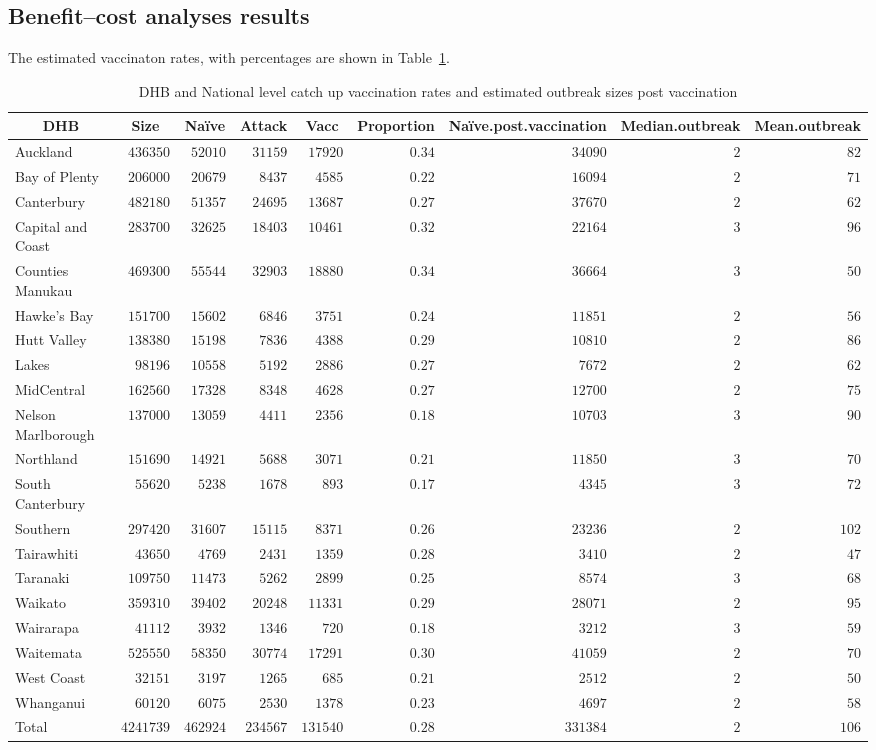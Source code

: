 \documentclass{article}
\begin{document}
\subsection{Benefit--cost analyses results}

The estimated vaccinaton rates, with percentages are shown in Table~\ref{table:vacp}.

\begin{table}\small
\caption{DHB and National level catch up vaccination rates and estimated outbreak sizes post vaccination}
\begin{center}
\begin{tabular}{lrrrrrrrr}
\hline\hline
\multicolumn{1}{c}{DHB}&\multicolumn{1}{c}{Size}&\multicolumn{1}{c}{Naïve}&\multicolumn{1}{c}{Attack}&\multicolumn{1}{c}{Vacc}&\multicolumn{1}{c}{Proportion}&\multicolumn{1}{c}{Naïve.post.vaccination}&\multicolumn{1}{c}{Median.outbreak}&\multicolumn{1}{c}{Mean.outbreak}\tabularnewline
\hline
Auckland&$ 436350$&$ 52010$&$ 31159$&$ 17920$&$0.34$&$ 34090$&$2$&$ 82$\tabularnewline
Bay of Plenty&$ 206000$&$ 20679$&$  8437$&$  4585$&$0.22$&$ 16094$&$2$&$ 71$\tabularnewline
Canterbury&$ 482180$&$ 51357$&$ 24695$&$ 13687$&$0.27$&$ 37670$&$2$&$ 62$\tabularnewline
Capital and Coast&$ 283700$&$ 32625$&$ 18403$&$ 10461$&$0.32$&$ 22164$&$3$&$ 96$\tabularnewline
Counties Manukau&$ 469300$&$ 55544$&$ 32903$&$ 18880$&$0.34$&$ 36664$&$3$&$ 50$\tabularnewline
Hawke's Bay&$ 151700$&$ 15602$&$  6846$&$  3751$&$0.24$&$ 11851$&$2$&$ 56$\tabularnewline
Hutt Valley&$ 138380$&$ 15198$&$  7836$&$  4388$&$0.29$&$ 10810$&$2$&$ 86$\tabularnewline
Lakes&$  98196$&$ 10558$&$  5192$&$  2886$&$0.27$&$  7672$&$2$&$ 62$\tabularnewline
MidCentral&$ 162560$&$ 17328$&$  8348$&$  4628$&$0.27$&$ 12700$&$2$&$ 75$\tabularnewline
Nelson Marlborough&$ 137000$&$ 13059$&$  4411$&$  2356$&$0.18$&$ 10703$&$3$&$ 90$\tabularnewline
Northland&$ 151690$&$ 14921$&$  5688$&$  3071$&$0.21$&$ 11850$&$3$&$ 70$\tabularnewline
South Canterbury&$  55620$&$  5238$&$  1678$&$   893$&$0.17$&$  4345$&$3$&$ 72$\tabularnewline
Southern&$ 297420$&$ 31607$&$ 15115$&$  8371$&$0.26$&$ 23236$&$2$&$102$\tabularnewline
Tairawhiti&$  43650$&$  4769$&$  2431$&$  1359$&$0.28$&$  3410$&$2$&$ 47$\tabularnewline
Taranaki&$ 109750$&$ 11473$&$  5262$&$  2899$&$0.25$&$  8574$&$3$&$ 68$\tabularnewline
Waikato&$ 359310$&$ 39402$&$ 20248$&$ 11331$&$0.29$&$ 28071$&$2$&$ 95$\tabularnewline
Wairarapa&$  41112$&$  3932$&$  1346$&$   720$&$0.18$&$  3212$&$3$&$ 59$\tabularnewline
Waitemata&$ 525550$&$ 58350$&$ 30774$&$ 17291$&$0.30$&$ 41059$&$2$&$ 70$\tabularnewline
West Coast&$  32151$&$  3197$&$  1265$&$   685$&$0.21$&$  2512$&$2$&$ 50$\tabularnewline
Whanganui&$  60120$&$  6075$&$  2530$&$  1378$&$0.23$&$  4697$&$2$&$ 58$\tabularnewline
Total&$4241739$&$462924$&$234567$&$131540$&$0.28$&$331384$&$2$&$106$\tabularnewline
\hline
\end{tabular}\end{center}\label{table:vacp}
\end{table}
\end{document}
